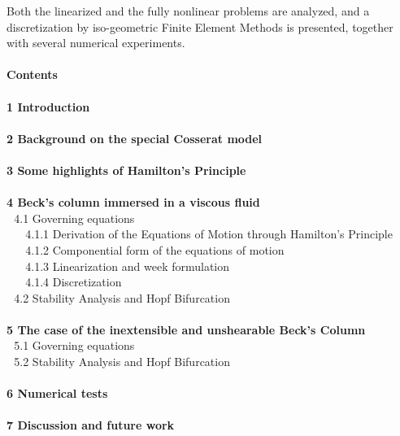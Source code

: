 \documentclass[12pt]{article}
\begin{document}
Both the linearized and the fully nonlinear problems are analyzed, and a discretization by iso-geometric Finite Element Methods is presented, together with several numerical experiments. 
\\\\
\textbf{Contents}\\\\
\textbf{1  Introduction}\\\\
\textbf{2  Background on the special Cosserat model}\\\\
\textbf{3  Some highlights of Hamilton’s Principle}\\\\
\textbf{4  Beck’s column immersed in a viscous fluid}\\
$\,\,\,\,$4.1 Governing equations\\
$\,\,\,\,\,\,\,\,\,\,$4.1.1 Derivation of the Equations of Motion through Hamilton’s Principle\\
$\,\,\,\,\,\,\,\,\,\,$4.1.2 Componential form of the equations of motion\\
$\,\,\,\,\,\,\,\,\,\,$4.1.3 Linearization and week formulation\\
$\,\,\,\,\,\,\,\,\,\,$4.1.4 Discretization\\
$\,\,\,\,$4.2 Stability Analysis and Hopf Bifurcation\\\\
\textbf{5  The case of the inextensible and unshearable Beck’s Column}\\
$\,\,\,\,$5.1 Governing equations\\
$\,\,\,\,$5.2 Stability Analysis and Hopf Bifurcation\\\\
\textbf{6  Numerical tests}\\\\
\textbf{7  Discussion and future work}\\
\\\\
\end{document}
